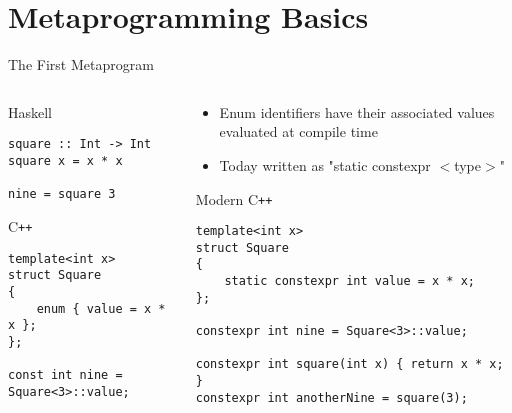 \documentclass[aspectratio=169]{beamer}
\begin{document}

\section{Metaprogramming Basics}

\begin{frame}[fragile]{The First Metaprogram}
    
\begin{columns}[t]
        \begin{column}{0.5\textwidth}
            \scriptsize
            \begin{block}{Haskell}
                \begin{verbatim}
square :: Int -> Int
square x = x * x

nine = square 3
                \end{verbatim}
            \end{block}
            
            \begin{block}{C\texttt{++}}
                \begin{verbatim}
template<int x>
struct Square 
{ 
    enum { value = x * x };  
};

const int nine = Square<3>::value;
                \end{verbatim}
            \end{block}
        \end{column}
        
        \begin{column}{0.5\textwidth}
            \begin{itemize}
                \item Enum identifiers have their associated values evaluated at compile time
                \pause
                \item Today written as "static constexpr $<$type$>$"
            \end{itemize}
            \scriptsize
            
            \begin{block}{Modern C\texttt{++}}
                \begin{verbatim}
template<int x>
struct Square 
{ 
    static constexpr int value = x * x;  
};

constexpr int nine = Square<3>::value;

constexpr int square(int x) { return x * x; }
constexpr int anotherNine = square(3);
                \end{verbatim}
            \end{block}
        \end{column}
\end{columns}
    
\end{frame}
\end{document}
